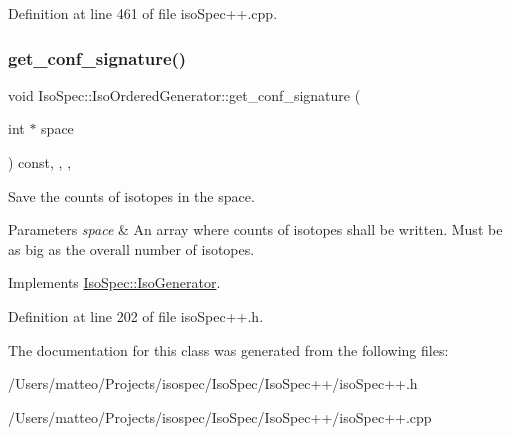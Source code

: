 Definition at line 461 of file iso\+Spec++.\+cpp.

\mbox{\label{class_iso_spec_1_1_iso_ordered_generator_af5d638985fd24c03bfe1f3d61e1b25c6}} 
\subsubsection{\texorpdfstring{get\+\_\+conf\+\_\+signature()}{get\_conf\_signature()}}
{\footnotesize\ttfamily void Iso\+Spec\+::\+Iso\+Ordered\+Generator\+::get\+\_\+conf\+\_\+signature (\begin{DoxyParamCaption}\item[{int $\ast$}]{space }\end{DoxyParamCaption}) const\hspace{0.3cm}{\ttfamily [inline]}, {\ttfamily [final]}, {\ttfamily [override]}, {\ttfamily [virtual]}}



Save the counts of isotopes in the space. 


\begin{DoxyParams}{Parameters}
{\em space} & An array where counts of isotopes shall be written. Must be as big as the overall number of isotopes. \\
\hline
\end{DoxyParams}


Implements \mbox{\hyperlink{class_iso_spec_1_1_iso_generator}{Iso\+Spec\+::\+Iso\+Generator}}.



Definition at line 202 of file iso\+Spec++.\+h.



The documentation for this class was generated from the following files\+:\begin{DoxyCompactItemize}
\item 
/\+Users/matteo/\+Projects/isospec/\+Iso\+Spec/\+Iso\+Spec++/iso\+Spec++.\+h\item 
/\+Users/matteo/\+Projects/isospec/\+Iso\+Spec/\+Iso\+Spec++/iso\+Spec++.\+cpp\end{DoxyCompactItemize}
